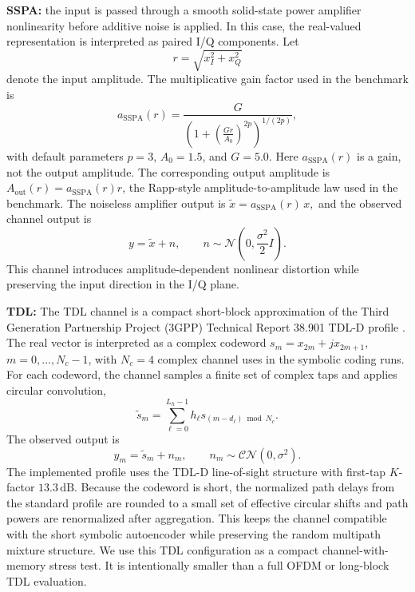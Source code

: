 \documentclass[10pt,journal]{IEEEtran}
\begin{document}
\textbf{SSPA:}
the input is passed through a smooth solid-state power amplifier nonlinearity before additive noise is applied.
In this case, the real-valued representation is interpreted as paired I/Q components.
Let
\begin{equation}
r = \sqrt{x_I^2 + x_Q^2}
\end{equation}
denote the input amplitude.
The multiplicative gain factor used in the benchmark is
\begin{equation}
a_{\mathrm{SSPA}}(r)
=
\frac{G}{\left(1+\left(\frac{Gr}{A_0}\right)^{2p}\right)^{1/(2p)}},
\end{equation}
with default parameters \(p=3\), \(A_0=1.5\), and \(G=5.0\).
Here \(a_{\mathrm{SSPA}}(r)\) is a gain, not the output amplitude.
The corresponding output amplitude is \(A_{\mathrm{out}}(r)=a_{\mathrm{SSPA}}(r)r\), the Rapp-style amplitude-to-amplitude law used in the benchmark.
The noiseless amplifier output is $\tilde{x} = a_{\mathrm{SSPA}}(r)\,x,$
and the observed channel output is
\begin{equation}
y = \tilde{x} + n,
\qquad
n \sim \mathcal{N}\!\left(0,\frac{\sigma^2}{2}I\right).
\end{equation}
This channel introduces amplitude-dependent nonlinear distortion while preserving the input direction in the I/Q plane.

\textbf{TDL:}
The TDL channel is a compact short-block approximation of the Third Generation Partnership Project (3GPP) Technical Report 38.901 TDL-D profile \cite{tr38901}.
The real vector is interpreted as a complex codeword \(s_m=x_{2m}+j x_{2m+1}\), \(m=0,\ldots,N_c-1\), with \(N_c=4\) complex channel uses in the symbolic coding runs.
For each codeword, the channel samples a finite set of complex taps and applies circular convolution,
\begin{equation}
\tilde{s}_m
=
\sum_{\ell=0}^{L_h-1}
h_\ell s_{(m-d_\ell)\bmod N_c}.
\end{equation}
The observed output is
\begin{equation}
y_m = \tilde{s}_m+n_m,
\qquad
n_m\sim \mathcal{CN}(0,\sigma^2).
\end{equation}
The implemented profile uses the TDL-D line-of-sight structure with first-tap \(K\)-factor \(13.3\,\mathrm{dB}\).
Because the codeword is short, the normalized path delays from the standard profile are rounded to a small set of effective circular shifts and path powers are renormalized after aggregation.
This keeps the channel compatible with the short symbolic autoencoder while preserving the random multipath mixture structure.
We use this TDL configuration as a compact channel-with-memory stress test.
It is intentionally smaller than a full OFDM or long-block TDL evaluation.
\end{document}
